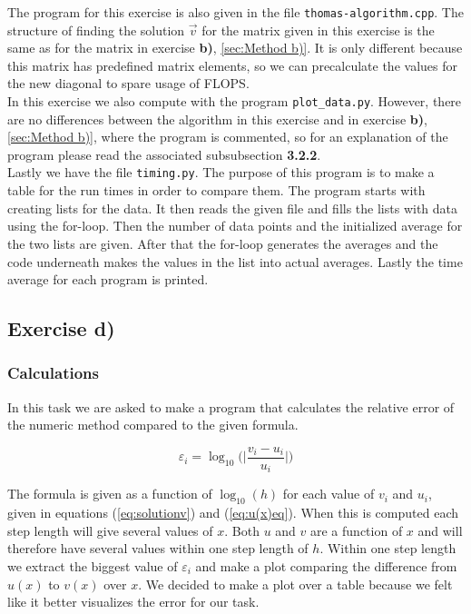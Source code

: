 \documentclass{article}
\begin{document}
    The program for this exercise is also given in the file \texttt{thomas-algorithm.cpp}. The structure of finding the solution $\vec{v}$ for the matrix given in this exercise is the same as for the matrix in exercise \textbf{b)}, \ref{sec:Method b)}. It is only different because this matrix has predefined matrix elements, so we can precalculate the values for the new diagonal to spare usage of FLOPS. \\

    In this exercise we also compute with the program \texttt{plot\_data.py}. However, there are no differences between the algorithm in this exercise and in exercise \textbf{b)}, \ref{sec:Method b)}, where the program is commented, so for an explanation of the program please read the associated subsubsection \textbf{3.2.2}. \\

    Lastly we have the file \texttt{timing.py}. The purpose of this program is to make a table for the run times in order to compare them. The program starts with creating lists for the data. It then reads the given file and fills the lists with data using the for-loop. Then the number of data points and the initialized average for the two lists are given. After that the for-loop generates the averages and the code underneath makes the values in the list into actual averages. Lastly the time average for each program is printed.


\subsection{Exercise d)} \label{sec:Method d)}

  \subsubsection{Calculations}

    In this task we are asked to make a program that calculates the relative error of the numeric method compared to the given formula.

    \begin{equation}
      \varepsilon_i = \log_{10} \bigg( \bigg| \frac{v_i - u_i}{u_i} \bigg| \bigg)    \label{eq:errorfunc}
    \end{equation}

    The formula is given as a function of $\log_{10}(h)$ for each value of $v_i$ and $u_i$, given in equations (\ref{eq:solutionv}) and (\ref{eq:u(x)eq}). When this is computed each step length will give several values of $x$. Both $u$ and $v$ are a function of $x$ and will therefore have several values within one step length of $h$. Within one step length we extract the biggest value of $\varepsilon_i$ and make a plot comparing the difference from $u(x)$ to $v(x)$ over $x$. We decided to make a plot over a table because we felt like it better visualizes the error for our task.
\end{document}
